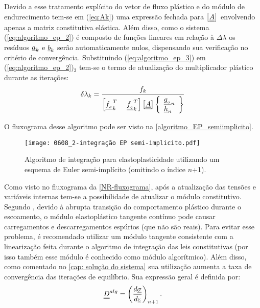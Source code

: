 Devido a esse tratamento explícito do vetor de fluxo plástico e do módulo de endurecimento tem-se em (\ref{eq:Ak}) uma expressão fechada para $\left[\underline{\underline A} \right]$ envolvendo apenas a matriz constitutiva elástica. Além disso, como o sistema (\ref{eq:algoritmo_ep_2}) é composto de funções lineares em relação à $\Delta \lambda$ os resíduos $\underline{a}_k$ e $\underline{b}_k$ serão automaticamente nulos, dispensando sua verificação no critério de convergência. Substituindo (\ref{eq:algoritmo_ep_3}) em (\ref{eq:algoritmo_ep_2})$_3$ tem-se o termo de atualização do multiplicador plástico durante as iterações:
\begin{equation}
	\label{eq:deltalambdak}
	\delta \lambda_k = \dfrac{f_k}{\left[\underline{f_{_\sigma}}_k^T~~~~\underline{f_{_q}}_k^T\right]\left[\underline{\underline A} \right]\left\{ 
	\begin{array}{lcl}
			\underline{g_{_\sigma}}_n \\ 
			\underline h_n
	\end{array}\right\}}
\end{equation}

O fluxograma desse algoritmo pode ser visto na \autoref{algoritmo_EP_semiimplicito}.

\begin{figure}[H]
	\begin{center}
		\texttt{[image: 0608\_2-integração EP semi-implicito.pdf]}
	\end{center}
	\caption{\label{algoritmo_EP_semiimplicito}Algoritmo de integração para elastoplasticidade utilizando um esquema de Euler semi-implícito (omitindo o índice $n$+1).}
\end{figure}
Como visto no fluxograma da \autoref{NR-fluxograma}, após a atualização das tensões e variáveis internas tem-se a possibilidade de atualizar o módulo constitutivo. Segundo , devido à abrupta transição do comportamento plástico durante o escoamento, o módulo elastoplástico tangente contínuo pode causar carregamentos e descarregamentos espúrios (que não são reais). Para evitar esse problema, é recomendado utilizar um módulo tangente consistente com a linearização feita durante o algoritmo de integração das leis constitutivas (por isso também esse módulo é conhecido como módulo algorítmico). Além disso, como comentado no \autoref{cap: solução do sistema} sua utilização aumenta a taxa de convergência das iterações de equilíbrio. Sua expressão geral é definida por:
\begin{equation}
	\label{eq:D_alg1}
	\underline{\underline D}^{alg} = \left(\dfrac{d\underline \sigma}{d\underline{\varepsilon}} \right)_{n+1}.
\end{equation}

